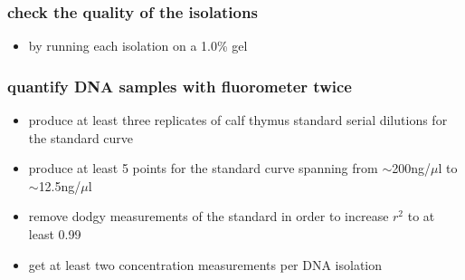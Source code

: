 \subsubsection
{check the quality of the isolations}
\begin{itemize}
\item by running each isolation on a 1.0\% gel
\end{itemize}


\subsubsection
{quantify DNA samples with fluorometer twice}
\begin{itemize}
\item produce at least three replicates of calf thymus standard serial dilutions for the standard curve
\item produce at least 5 points for the standard curve spanning from $\sim$200ng/$\mu$l to $\sim$12.5ng/$\mu$l
\item remove dodgy measurements of the standard in order to increase $r^{2}$ to at least 0.99
\item get at least two concentration measurements per DNA isolation
\end{itemize}


